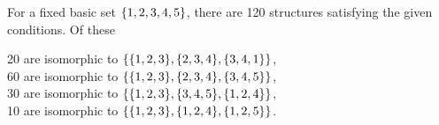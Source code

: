 \begin{solution}
For a fixed basic set $\left\{1,2,3,4,5\right\}$, there are 120 structures satisfying the given conditions.
Of these
\begin{center}
    20 are isomorphic to $\set{\set{1,2,3},\set{2,3,4},\set{3,4,1}}$,\\
    60 are isomorphic to $\set{\set{1,2,3},\set{2,3,4},\set{3,4,5}}$,\\
    30 are isomorphic to $\set{\set{1,2,3},\set{3,4,5},\set{1,2,4}}$,\\
    10 are isomorphic to $\set{\set{1,2,3},\set{1,2,4},\set{1,2,5}}$.
\end{center}
\end{solution}
